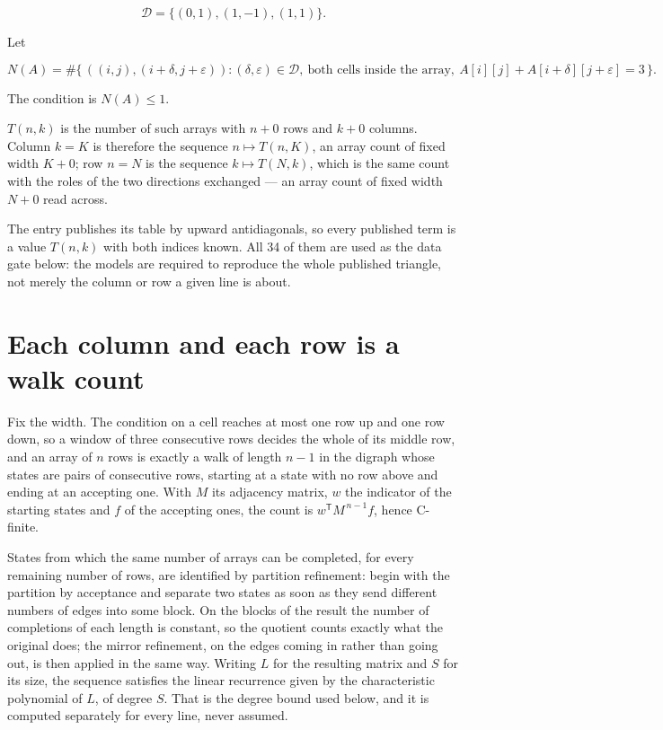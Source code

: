\documentclass[11pt]{article}
\theoremstyle{definition}
\begin{document}
\[\mathcal{D} = \{(0,1), (1,-1), (1,1)\}.\]

Let

\[N(A) = \#\bigl\{\,((i,j),(i{+}\delta,j{+}\varepsilon)) : (\delta,\varepsilon) \in \mathcal{D},\ \text{both cells inside the array},\ A[i][j] + A[i{+}\delta][j{+}\varepsilon] = 3\,\bigr\}.\]

The condition is $N(A) \le 1$.

$T(n,k)$ is the number of such arrays with $n + 0$ rows and $k + 0$ columns. Column $k = K$ is therefore the sequence $n \mapsto T(n,K)$, an array count of fixed width $K + 0$; row $n = N$ is the sequence $k \mapsto T(N,k)$, which is the same count with the roles of the two directions exchanged --- an array count of fixed width $N + 0$ read across.

The entry publishes its table by upward antidiagonals, so every published term is a value $T(n,k)$ with both indices known. All 34 of them are used as the data gate below: the models are required to reproduce the whole published triangle, not merely the column or row a given line is about.

\section{Each column and each row is a walk count}

Fix the width. The condition on a cell reaches at most one row up and one row down, so a window of three consecutive rows decides the whole of its middle row, and an array of $n$ rows is exactly a walk of length $n-1$ in the digraph whose states are pairs of consecutive rows, starting at a state with no row above and ending at an accepting one. With $M$ its adjacency matrix, $w$ the indicator of the starting states and $f$ of the accepting ones, the count is $w^{\mathsf T}M^{\,n-1}f$, hence C-finite.

States from which the same number of arrays can be completed, for every remaining number of rows, are identified by partition refinement: begin with the partition by acceptance and separate two states as soon as they send different numbers of edges into some block. On the blocks of the result the number of completions of each length is constant, so the quotient counts exactly what the original does; the mirror refinement, on the edges coming in rather than going out, is then applied in the same way. Writing $L$ for the resulting matrix and $S$ for its size, the sequence satisfies the linear recurrence given by the characteristic polynomial of $L$, of degree $S$. That is the degree bound used below, and it is computed separately for every line, never assumed.
\end{document}

